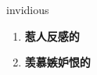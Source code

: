 
\begin{frame}
{\huge invidious}
\begin{center}
\begin{enumerate}\Large
  \item \textbf{惹人反感的}
  \item \textbf{羡慕嫉妒恨的}
\end{enumerate}
\end{center}
\end{frame}

